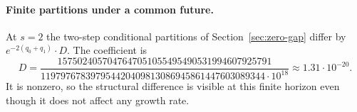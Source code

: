 \paragraph{Finite partitions under a common future.}
At $s=2$ the two-step conditional partitions of Section~\ref{sec:zero-gap} differ by $e^{-2(q_0+q_1)}\cdot D$. The coefficient is
\[
D=\frac{1575024057047647051055495490531994607925791}{119797678397954420409813086945861447603089344\cdot10^{18}}\approx1.31\cdot10^{-20}.
\]
It is nonzero, so the structural difference is visible at this finite horizon even though it does not affect any growth rate.
